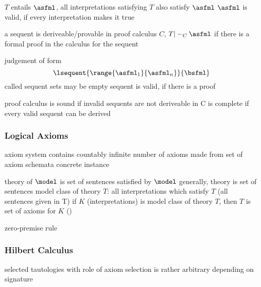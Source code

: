             $T$ entails $\asfml$, all interpretations satisfying $T$ also satisfy $\asfml$
            $\asfml$ is valid, if every interpretation makes it true

            a sequent is deriveable/provable in proof calculus $C$, $T|-_C\asfml$ if there is a formal proof in the calculus for the sequent

            judgement of form
            \begin{equation}
                \lsequent{\range{\asfml_1}{\asfml_n}}{\bsfml}
            \end{equation}
            called sequent
            sets may be empty
            sequent is valid, if there is a proof

            proof calculus is sound if invalid sequents are not deriveable in C
            is complete if every valid sequent can be derived

            \subsubsection{Logical Axioms}
                \label{sec:FOL-axioms}

                axiom system contains countably infinite number of axioms
                made from set of axiom schemata
                concrete instance

                theory of $\model$ is set of sentences satisfied by $\model$
                generally, theory is set of sentences
                model class of theory $T$: all interpretations which satisfy $T$ (all sentences given in T)
                if $K$ (interpretations) is model class of theory $T$, then $T$ is set of axioms for $K$ (\cite{Hodges01ClassicalLogic})

                zero-premise rule
                \begin{calculus}
                    \cinferenceRule[ax|]{}{
                        \linferenceRule[sequent]{}{\lsequent{\asfml}{\asfml}}
                    }{}
                \end{calculus}

            \subsubsection{Hilbert Calculus}
                \label{sec:hilbert-calculus}

                \cite{Hodges01ClassicalLogic}

                selected tautologies with role of axiom
                selection is rather arbitrary
                depending on signature

